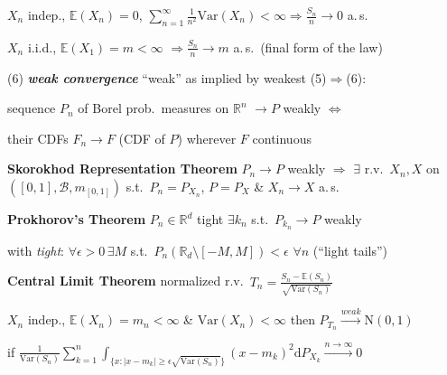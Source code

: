 \documentclass[8pt,twoside]{extarticle}
\begin{document}
\begin{multicols}{2}
\textbullet $X_n$ indep., $\mathbb{E}(X_n){=}0$, $\sum_{n=1}^\infty\frac{1}{n^2}\mathrm{Var}(X_n)<\infty \Rightarrow \frac{S_n}{n}\to 0$ a.\,s.\ %

\textbullet $X_n$ i.i.d., $\mathbb{E}(X_1){=}m<\infty$ $\Rightarrow \frac{S_n}{n}\to m$ a.\,s.\ (final form of the law)

(6) \textbf{\textit{weak convergence}} ``weak'' as implied by weakest (5)$\Rightarrow$(6):

\hspace{1.7em}sequence $P_n$ of Borel prob.\ measures on $\mathbb{R}^n$ $\to\!\!P$ weakly  \hfill$\Leftrightarrow$ 

\hspace{1.7em}their CDFs $F_n \to F$ (CDF of $P$) wherever $F$ continuous


\textbf{Skorokhod Representation Theorem} $P_n{\to} P$ weakly $\!\Rightarrow$ 
$\exists$ r.v.\ $X_n,X$ on $\left([0,1],\mathcal{B},m_{[0,1]}\right)$ s.t.\ $P_n{=}P_{X_n}$, $P{=}P_X$ \& $X_n{\to} X$ a.\,s.\



\textbf{Prokhorov's Theorem} $P_n{\in}\mathbb{R}^d$ tight $\exists k_n$ s.t.\ $P_{k_n}\to P$ weakly

with \textit{tight}: $\forall\epsilon{>}0\,\exists M$ s.t.\ $P_n(\mathbb{R}_d{\setminus}[-M,M])<\epsilon \,\,\forall n$ (``light tails'')



\textbf{Central Limit Theorem} normalized r.v.\ $T_n=\frac{S_n-\mathbb{E}(S_n)}{\sqrt{\mathrm{Var}(S_n)}}$

$X_n$ indep., $\mathbb{E}(X_n){=}m_n{<}\infty$ \& $\mathrm{Var}(X_n){<}\infty$ then $P_{T_n}\overset{weak}{\to} \mathrm{N}(0,1)$

if $\frac{1}{\mathrm{Var}(S_n)}\sum_{k=1}^n\int_{\{x:|x-m_k|\geq \epsilon\sqrt{\mathrm{Var}(S_n)}\}}(x-m_k)^2\mathrm{d}P_{X_k}\overset{n\to\infty}{\to}0$



\end{multicols}
\end{document}
